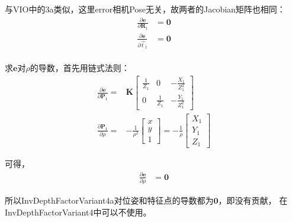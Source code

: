 \documentclass{article}
\begin{document}
与VIO中的3a类似，这里error相机Pose无关，故两者的Jacobian矩阵也相同：
\begin{equation}
	\begin{aligned}
		\frac {\partial{\boldsymbol{e}}}{\partial{\boldsymbol{R}_1}} & =\boldsymbol{0} \\
		\frac {\partial{\boldsymbol{e}}}{\partial{\vec{t}_1}}        & =\boldsymbol{0} \\
	\end{aligned}
\end{equation}

求$\boldsymbol{e}$对$\rho$的导数，首先用链式法则：
\begin{equation}
	\begin{aligned}
		\frac{\partial\boldsymbol{e}}{\partial\boldsymbol{P}_1}=&\boldsymbol{K}
		\left[
		\begin{matrix}
		\frac{1}{Z_1} & 0             & -\frac{X_1}{Z_1^2} \\
		0             & \frac{1}{Z_1} & -\frac{Y_1}{Z_1^2} 
		\end{matrix}
		\right]\\
		\frac{\partial\boldsymbol{P}_1}{\partial\rho}=&-\frac{1}{\rho^2}
		\left[
		\begin{matrix}
		x\\
		y\\
		1
		\end{matrix}
		\right] = -\frac{1}{\rho}
		\left[
		\begin{matrix}
		X_1 \\
		Y_1 \\
		Z_1 
		\end{matrix}
		\right]
	\end{aligned}
\end{equation}

可得，
\begin{equation}
	\begin{aligned}
		\frac{\partial{\boldsymbol{e}}}{\partial{\rho}}&=\boldsymbol{0} 
	\end{aligned}
\end{equation}

所以InvDepthFactorVariant4a对位姿和特征点的导数都为$\boldsymbol{0}$，即没有贡献，
在InvDepthFactorVariant4中可以不使用。
\end{document}
